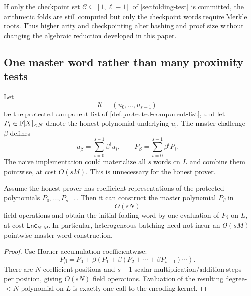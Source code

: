 If only the checkpoint set $\mathcal C\subseteq[1,\ell-1]$ of \cref{sec:folding-test} is committed, the arithmetic folds are still computed but only the checkpoint words require Merkle roots.  Thus higher arity and checkpointing alter hashing and proof size without changing the algebraic reduction developed in this paper.

\subsection{One master word rather than many proximity tests}
\label{sec:complexity-master-word}

Let
\[
  \mathcal U=(u_0,\ldots,u_{s-1})
\]
be the protected component list of \cref{def:protected-component-list}, and let $P_i\in\mathbb{F}[X]_{<N}$ denote the honest polynomial underlying $u_i$.  The master challenge $\beta$ defines
\begin{equation}
  u_{\beta}
  =\sum_{i=0}^{s-1}\beta^iu_i,
  \qquad
  P_{\beta}
  =\sum_{i=0}^{s-1}\beta^iP_i.
  \label{eq:complexity-master-poly}
\end{equation}
The naive implementation could materialize all $s$ words on $L$ and combine them pointwise, at cost $O(sM)$.  This is unnecessary for the honest prover.

\begin{proposition}
\label{prop:master-coefficient-side}
Assume the honest prover has coefficient representations of the protected polynomials $P_0,\ldots,P_{s-1}$.  Then it can construct the master polynomial $P_{\beta}$ in
\begin{equation}
  O(sN)
  \label{eq:master-coeff-cost}
\end{equation}
field operations and obtain the initial folding word by one evaluation of $P_{\beta}$ on $L$, at cost $\mathsf{Enc}_{N,M}$.  In particular, heterogeneous batching need not incur an $O(sM)$ pointwise master-word construction.
\end{proposition}

\begin{proof}
Use Horner accumulation coefficientwise:
\[
  P_{\beta}
  =P_0+\beta(P_1+\beta(P_2+\cdots+\beta P_{s-1})\cdots).
\]
There are $N$ coefficient positions and $s-1$ scalar multiplication/addition steps per position, giving $O(sN)$ field operations.  Evaluation of the resulting degree-$<N$ polynomial on $L$ is exactly one call to the encoding kernel.
\end{proof}

